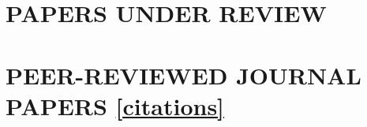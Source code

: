 \documentclass[paper=a4,fontsize=11pt]{scrartcl} %
\newcommand{\NewPart}[2]{\section*{\uppercase{#1} #2}}
\begin{document}
 

\newpage


\NewPart{Papers under Review}{}{}



\begin{etaremune}

\item {}

\item {}




\end{etaremune}


\NewPart{Peer-Reviewed Journal Papers}{\href{https://scholar.google.de/citations?user=RzdZi_IAAAAJ&hl=de}{[citations]}}
\end{document}

